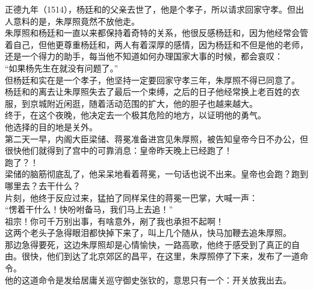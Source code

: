 \begin{multicols}{\theparacolNo}
正德九年（1514），杨廷和的父亲去世了，他是个孝子，所以请求回家守孝。但出人意料的是，朱厚照竟然不放他走。\\

朱厚照和杨廷和一直以来都保持着奇特的关系，他很反感杨廷和，因为他经常会管着自己，但他更尊重杨廷和，两人有着深厚的感情，因为杨廷和不但是他的老师，还是一个得力的助手，每当他不知道如何办理国家大事的时候，都会哀叹：\\

“如果杨先生在就没有问题了。”\\

但杨廷和实在是一个孝子，他坚持一定要回家守孝三年，朱厚照不得已同意了。\\

杨廷和的离去让朱厚照失去了最后一个束缚，之后的日子他经常换上老百姓的衣服，到京城附近闲逛，随着活动范围的扩大，他的胆子也越来越大。\\

终于，在这个夜晚，他决定去一个极其危险的地方，以证明他的勇气。\\

他选择的目的地是关外。\\

第二天一早，内阁大臣梁储、蒋冕准备进宫见朱厚照，被告知皇帝今日不办公，但很快他们就得到了宫中的可靠消息：皇帝昨天晚上已经跑了！\\

跑了？！\\

梁储的脑筋彻底乱了，他呆呆地看着蒋冕，一句话也说不出来。皇帝也会跑？跑到哪里去？去干什么？\\

片刻，他终于反应过来，猛拍了同样呆住的蒋冕一巴掌，大喊一声：\\

“愣着干什么！快吩咐备马，我们马上去追！”\\

祖宗！你可千万别出事，有啥意外，剐了我也承担不起啊！\\

这两个老头子急得眼泪都快掉下来了，叫上几个随从，快马加鞭去追朱厚照。\\

那边急得要死，这边朱厚照却是心情愉快，一路高歌，他终于感受到了真正的自由。很快，他们到达了北京郊区的昌平，在这里，朱厚照停了下来，发布了一道命令。\\

他的这道命令是发给居庸关巡守御史张钦的，意思只有一个：开关放我出去。\\


\end{multicols}
